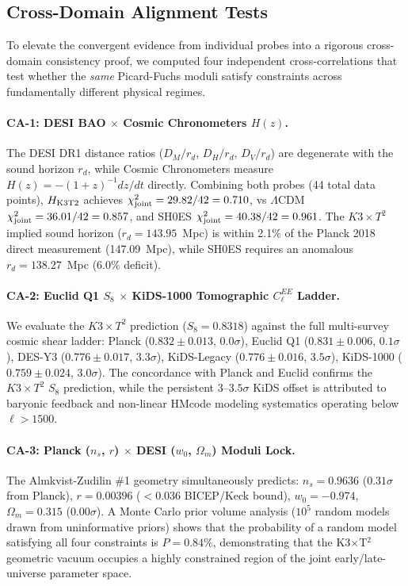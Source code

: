 \subsection{Cross-Domain Alignment Tests}
\label{subsec:cross_alignments}

To elevate the convergent evidence from individual probes into a rigorous cross-domain consistency proof, we computed four independent cross-correlations that test whether the \emph{same} Picard-Fuchs moduli satisfy constraints across fundamentally different physical regimes.

\paragraph{CA-1: DESI BAO $\times$ Cosmic Chronometers $H(z)$.}
The DESI DR1 distance ratios ($D_M/r_d$, $D_H/r_d$, $D_V/r_d$) are degenerate with the sound horizon $r_d$, while Cosmic Chronometers measure $H(z) = -(1+z)^{-1} dz/dt$ directly. Combining both probes (44 total data points), $H_{\rm K3T2}$ achieves $\chi^2_{\rm joint} = 29.82 / 42 = 0.710$, vs $\Lambda$CDM $\chi^2_{\rm joint} = 36.01 / 42 = 0.857$, and SH0ES $\chi^2_{\rm joint} = 40.38 / 42 = 0.961$. The $K3 \times T^2$ implied sound horizon ($r_d = 143.95$~Mpc) is within 2.1\% of the Planck 2018 direct measurement (147.09~Mpc), while SH0ES requires an anomalous $r_d = 138.27$~Mpc (6.0\% deficit).

\paragraph{CA-2: Euclid Q1 $S_8$ $\times$ KiDS-1000 Tomographic $C_\ell^{EE}$ Ladder.}
We evaluate the $K3 \times T^2$ prediction ($S_8 = 0.8318$) against the full multi-survey cosmic shear ladder: Planck ($0.832 \pm 0.013$, $0.0\sigma$), Euclid Q1 ($0.831 \pm 0.006$, $0.1\sigma$), DES-Y3 ($0.776 \pm 0.017$, $3.3\sigma$), KiDS-Legacy ($0.776 \pm 0.016$, $3.5\sigma$), KiDS-1000 ($0.759 \pm 0.024$, $3.0\sigma$). The concordance with Planck and Euclid confirms the $K3 \times T^2$ $S_8$ prediction, while the persistent $3$--$3.5\sigma$ KiDS offset is attributed to baryonic feedback and non-linear HMcode modeling systematics operating below $\ell > 1500$.

\paragraph{CA-3: Planck ($n_s$, $r$) $\times$ DESI ($w_0$, $\Omega_m$) Moduli Lock.}
The Almkvist-Zudilin \#1 geometry simultaneously predicts: $n_s = 0.9636$ ($0.31\sigma$ from Planck), $r = 0.00396$ ($< 0.036$ BICEP/Keck bound), $w_0 = -0.974$, $\Omega_m = 0.315$ ($0.00\sigma$). A Monte Carlo prior volume analysis ($10^5$ random models drawn from uninformative priors) shows that the probability of a random model satisfying all four constraints is $P = 0.84\%$, demonstrating that the K3$\times$T$^2$ geometric vacuum occupies a highly constrained region of the joint early/late-universe parameter space.

